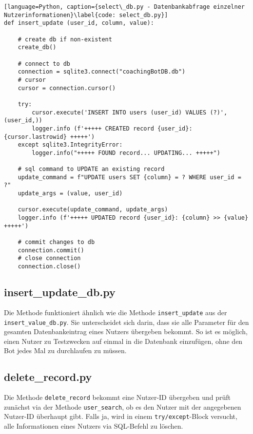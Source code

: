                 \begin{lstlisting}[language=Python, caption={select\_db.py - Datenbankabfrage einzelner Nutzerinformationen}\label{code: select_db.py}]
def insert_update (user_id, column, value):

    # create db if non-existent
    create_db()

    # connect to db
    connection = sqlite3.connect("coachingBotDB.db")
    # cursor
    cursor = connection.cursor()

    try:
        cursor.execute('INSERT INTO users (user_id) VALUES (?)', (user_id,))
        logger.info (f'+++++ CREATED record {user_id}: {cursor.lastrowid} +++++')
    except sqlite3.IntegrityError:
        logger.info("+++++ FOUND record... UPDATING... +++++")

    # sql command to UPDATE an existing record
    update_command = f"UPDATE users SET {column} = ? WHERE user_id = ?"
    update_args = (value, user_id)

    cursor.execute(update_command, update_args)
    logger.info (f'+++++ UPDATED record {user_id}: {column} >> {value} +++++')

    # commit changes to db
    connection.commit()
    # close connection
    connection.close()

                \end{lstlisting}
        
        \subsection{insert\_update\_db.py} \label{insert_update_db.py}
                Die Methode funktioniert ähnlich wie die Methode \verb|insert_update| aus der \\\verb|insert_value_db.py|. Sie unterscheidet sich darin, dass sie alle Parameter für den gesamten Datenbankeintrag eines Nutzers übergeben bekommt. So ist es möglich, einen Nutzer zu Testzwecken auf einmal in die Datenbank einzufügen, ohne den Bot jedes Mal zu durchlaufen zu müssen.
        
        \subsection{delete\_record.py} \label{delete_record.py}
                Die Methode \verb|delete_record| bekommt eine Nutzer-ID übergeben und prüft zunächst via der Methode \verb|user_search|, ob es den Nutzer mit der angegebenen Nutzer-ID überhaupt gibt. Falls ja, wird in einem \verb|try/except|-Block versucht, alle Informationen eines Nutzers via SQL-Befehl zu löschen. 

